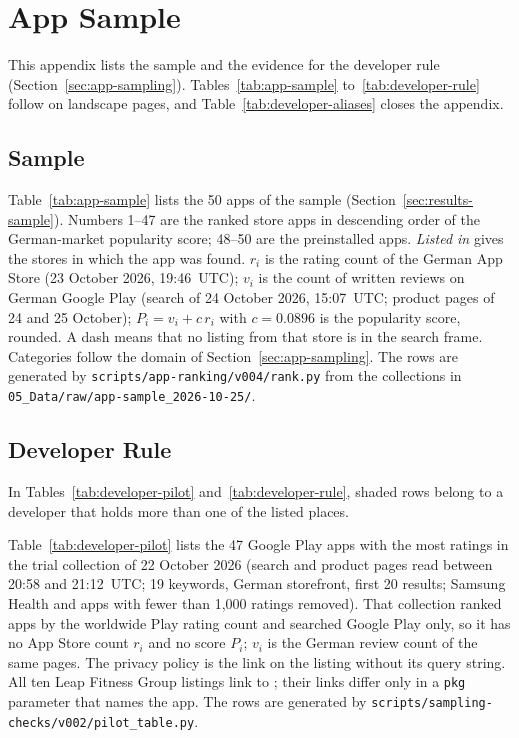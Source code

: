 \chapter{App Sample}
\label{app:app-sample}
This appendix lists the sample and the evidence for the developer rule
(Section~\ref{sec:app-sampling}). Tables~\ref{tab:app-sample}
to~\ref{tab:developer-rule} follow on landscape pages, and
Table~\ref{tab:developer-aliases} closes the appendix.

\section{Sample}
Table~\ref{tab:app-sample} lists the 50 apps of the sample
(Section~\ref{sec:results-sample}). Numbers 1--47 are the ranked store apps in
descending order of the German-market popularity score; 48--50 are the
preinstalled apps. \emph{Listed in} gives the stores in which the app was found.
$r_i$ is the rating count of the German App Store (23 October 2026, 19:46~UTC);
$v_i$ is the count of written reviews on German Google Play (search of 24
October 2026, 15:07~UTC; product pages of 24 and 25 October); $P_i=v_i+c\,r_i$
with $c=0.0896$ is the popularity score, rounded. A dash means that no listing
from that store is in the search frame.
Categories follow the domain of Section~\ref{sec:app-sampling}. The rows are
generated by \texttt{scripts/app-ranking/v004/rank.py} from the collections in
\texttt{05\_Data/raw/app-sample\_2026-10-25/}.

\section{Developer Rule}
\label{app:developer-rule}
In Tables~\ref{tab:developer-pilot} and~\ref{tab:developer-rule}, shaded rows
belong to a developer that holds more than one of the listed places.

Table~\ref{tab:developer-pilot} lists the 47 Google Play apps with the most
ratings in the trial collection of 22 October 2026 (search and product pages
read between 20:58 and 21:12~UTC; 19 keywords, German storefront, first 20
results; Samsung Health and apps with fewer than 1{,}000 ratings removed). That
collection ranked apps by the worldwide Play rating count and searched Google
Play only, so it has no App Store count $r_i$ and no score $P_i$; $v_i$ is the
German review count of the same pages. The privacy policy is the link on the
listing without its query string. All ten Leap Fitness Group listings link to
; their links differ only in a
\texttt{pkg} parameter that names the app. The rows are generated by
\texttt{scripts/sampling-checks/v002/pilot\_table.py}.

